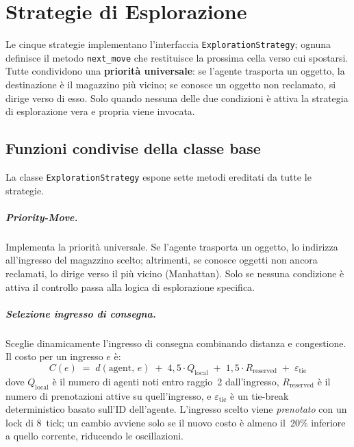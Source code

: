\chapter{Strategie di Esplorazione}

Le cinque strategie implementano l'interfaccia \texttt{ExplorationStrategy}; ognuna definisce
il metodo \texttt{next\_move} che restituisce la prossima cella verso cui spostarsi.
Tutte condividono una \textbf{priorit\`a universale}: se l'agente trasporta un oggetto,
la destinazione \`e il magazzino pi\`u vicino; se conosce un oggetto non reclamato, si dirige
verso di esso. Solo quando nessuna delle due condizioni \`e attiva la strategia di
esplorazione vera e propria viene invocata.

\section{Funzioni condivise della classe base}

La classe \texttt{ExplorationStrategy} espone sette metodi ereditati da tutte le strategie.

\paragraph{Priority-Move.}
Implementa la priorit\`a universale. Se l'agente trasporta un oggetto, lo indirizza
all'ingresso del magazzino scelto; altrimenti, se conosce oggetti non ancora reclamati,
lo dirige verso il pi\`u vicino (Manhattan). Solo se nessuna condizione \`e attiva il
controllo passa alla logica di esplorazione specifica.

\paragraph{Selezione ingresso di consegna.}
Sceglie dinamicamente l'ingresso di consegna combinando distanza e congestione.
Il costo per un ingresso $e$ \`e:
$$C(e) \;=\; d(\text{agent},\,e) \;+\; 4{,}5\cdot Q_{\text{local}}
         \;+\; 1{,}5\cdot R_{\text{reserved}} \;+\; \varepsilon_{\text{tie}}$$
dove $Q_{\text{local}}$ \`e il numero di agenti noti entro raggio~2 dall'ingresso,
$R_{\text{reserved}}$ \`e il numero di prenotazioni attive su quell'ingresso, e
$\varepsilon_{\text{tie}}$ \`e un tie-break deterministico basato
sull'ID dell'agente.
L'ingresso scelto viene \emph{prenotato} con un lock di 8~tick; un cambio
avviene solo se il nuovo costo \`e almeno il~20\% inferiore a quello corrente,
riducendo le oscillazioni.

